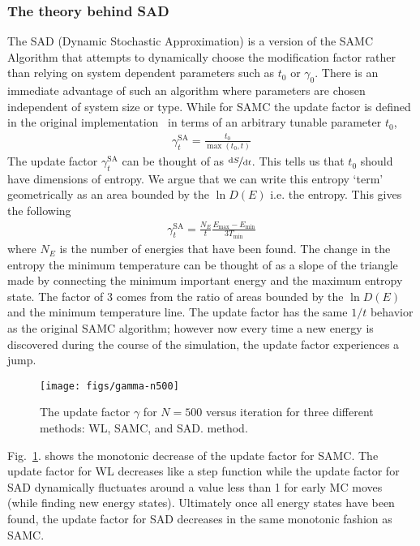 \documentclass[letterpaper,twocolumn,amsmath,amssymb,pre,aps,10pt]{revtex4-1}
\begin{document}
\subsubsection{The theory behind SAD}
The SAD (Dynamic Stochastic Approximation) is a version of the SAMC
Algorithm that attempts to dynamically choose the modification factor
rather than relying on system dependent parameters such as $t_0$ or
$\gamma_0$.  There is an immediate advantage of such an algorithm where
parameters are chosen independent of system size or type. While for
SAMC the update factor is defined in the original
implementation~\cite{liang2007stochastic} in terms of an arbitrary
tunable parameter $t_0$,
\begin{align}
\gamma_{t}^{\text{SA}} = \frac{t_0}{\max(t_0,t)}
\end{align}
The update factor $\gamma_{t}^{\text{SA}}$ can be thought of as
$\nicefrac{\text{d}S}{\text{d}t}$. This tells us that $t_0$ should have
dimensions of entropy.  We argue that we can write this entropy `term'
geometrically as an area bounded by the $\ln{D(E)}$ i.e. the entropy.  This
gives the following
\begin{align}
\gamma_{t}^{\text{SA}} =
\frac{N_E}{t}\frac{E_{\text{max}}-E_{\text{min}}}{3T_{\text{min}}}
\end{align}
where $N_E$ is the number of energies that have been found. The change
in the entropy the minimum temperature can be thought of as a slope of
the triangle made by connecting the minimum important energy and the
maximum entropy state.  The factor of $3$ comes from the ratio of areas bounded
by the $\ln{D(E)}$ and the minimum temperature line.
The update factor has the same $1/t$ behavior as the original SAMC algorithm;
however now every time a new energy is discovered during the course
of the simulation, the update factor experiences a jump.

\begin{figure}
  \texttt{[image: figs/gamma-n500]}
  \caption{The update factor $\gamma$ for $N=500$ versus iteration for three
    different methods: WL, SAMC, and SAD.
    method.}\label{fig:gamma-vs-t}
\end{figure}

Fig.~\ref{fig:gamma-vs-t}. shows the monotonic decrease of the update
factor for SAMC.  The update factor for WL decreases like a step
function while the update factor for SAD dynamically fluctuates around
a value less than 1 for early MC moves (while finding new energy
states).  Ultimately once all energy states have been found, the update
factor for SAD decreases in the same monotonic fashion as SAMC.
\end{document}
